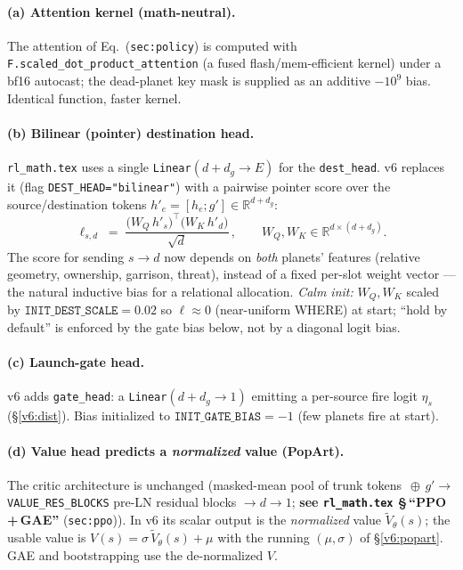 \documentclass[11pt]{article}
\newcommand{\R}{\mathbb{R}}
\newcommand{\cd}[1]{\texttt{#1}}
\newcommand{\rlref}[2]{\textbf{see \texttt{rl\_math.tex} \S\,``#1''} (\texttt{#2})}
\begin{document}
\paragraph{(a) Attention kernel (math-neutral).} The attention of Eq.~(\texttt{sec:policy}) is computed
with \cd{F.scaled\_dot\_product\_attention} (a fused flash/mem-efficient kernel) under a bf16 autocast;
the dead-planet key mask is supplied as an additive $-10^9$ bias. Identical function, faster kernel.

\paragraph{(b) Bilinear (pointer) destination head.} \texttt{rl\_math.tex} uses a single
\cd{Linear}$(d{+}d_g\!\to\!E)$ for the \cd{dest\_head}. v6 replaces it (flag \cd{DEST\_HEAD="bilinear"})
with a pairwise pointer score over the source/destination tokens $h'_e=[h_e;g']\in\R^{d+d_g}$:
\begin{equation}
\ell_{s,d} \;=\; \frac{\big(W_Q\,h'_s\big)^{\!\top}\big(W_K\,h'_d\big)}{\sqrt{d}}\,,\qquad
W_Q,W_K\in\R^{d\times(d+d_g)} .
\end{equation}
The score for sending $s\!\to\!d$ now depends on \emph{both} planets' features (relative geometry,
ownership, garrison, threat), instead of a fixed per-slot weight vector --- the natural inductive bias for
a relational allocation. \emph{Calm init:} $W_Q,W_K$ scaled by $\cd{INIT\_DEST\_SCALE}=0.02$ so
$\ell\approx 0$ (near-uniform WHERE) at start; ``hold by default'' is enforced by the gate bias below, not
by a diagonal logit bias.

\paragraph{(c) Launch-gate head.} v6 adds \cd{gate\_head}: a \cd{Linear}$(d{+}d_g\!\to\!1)$ emitting a
per-source fire logit $\eta_s$ (\S\ref{v6:dist}). Bias initialized to $\cd{INIT\_GATE\_BIAS}=-1$ (few
planets fire at start).

\paragraph{(d) Value head predicts a \emph{normalized} value (PopArt).} The critic architecture is
unchanged (masked-mean pool of trunk tokens $\,\oplus\,g'\to$ \cd{VALUE\_RES\_BLOCKS} pre-LN residual
blocks $\to d{\to}1$; \rlref{PPO\,+\,GAE}{sec:ppo}). In v6 its scalar output is the \emph{normalized}
value $\tilde V_\theta(s)$; the usable value is $V(s)=\sigma\,\tilde V_\theta(s)+\mu$ with the running
$(\mu,\sigma)$ of \S\ref{v6:popart}. GAE and bootstrapping use the de-normalized $V$.
\end{document}
